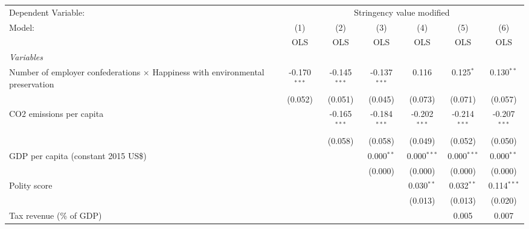 
\begingroup
\centering
\begin{tabular}{lcccccc}
   \toprule
   Dependent Variable: & \multicolumn{6}{c}{Stringency value modified}\\
   Model:                                                                                & (1)            & (2)            & (3)            & (4)            & (5)            & (6)\\  
                                                                                         &  OLS           & OLS            & OLS            & OLS            & OLS            & OLS\\  
   \midrule
   \emph{Variables}\\
   Number of employer confederations $\times$ Happiness with environmental preservation  & -0.170$^{***}$ & -0.145$^{***}$ & -0.137$^{***}$ & 0.116          & 0.125$^{*}$    & 0.130$^{**}$\\   
                                                                                         & (0.052)        & (0.051)        & (0.045)        & (0.073)        & (0.071)        & (0.057)\\   
   CO2 emissions per capita                                                              &                & -0.165$^{***}$ & -0.184$^{***}$ & -0.202$^{***}$ & -0.214$^{***}$ & -0.207$^{***}$\\   
                                                                                         &                & (0.058)        & (0.058)        & (0.049)        & (0.052)        & (0.050)\\   
   GDP per capita (constant 2015 US\$)                                                   &                &                & 0.000$^{**}$   & 0.000$^{***}$  & 0.000$^{***}$  & 0.000$^{**}$\\   
                                                                                         &                &                & (0.000)        & (0.000)        & (0.000)        & (0.000)\\   
   Polity score                                                                          &                &                &                & 0.030$^{**}$   & 0.032$^{**}$   & 0.114$^{***}$\\   
                                                                                         &                &                &                & (0.013)        & (0.013)        & (0.020)\\   
   Tax revenue (\% of GDP)                                                               &                &                &                &                & 0.005          & 0.007\\   

\end{tabular}
